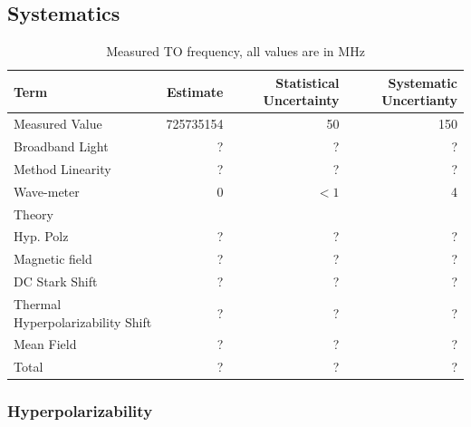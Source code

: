 \documentclass[aps,prl,
,reprint,
superscriptaddress,
onecolumn,
showpacs,preprintnumbers,
 amsmath,amssymb,
]{revtex4-1}
\begin{document}
\subsection{Systematics}



\begin{table}[h]
\centering
\begin{tabular}{l|r|r|r}
\hline
Term              & Estimate & Statistical Uncertainty & Systematic Uncertianty \\
\hline
Measured Value      & 725735154             & 50    & 150            \\
Broadband Light     & ?                     & ?     & ?        \\
Method Linearity    & ?                     & ?     & ?             \\
Wave-meter          & 0                     & $<1$    & 4             \\
\hline
\multicolumn{4}{l}{Theory}\\
\hline
Hyp. Polz           & ?                     & ?     & ?        \\
Magnetic field      & ?                     & ?     & ?             \\
DC Stark Shift      & ?                     & ?     & ?             \\
Thermal Hyperpolarizability Shift & ?     & ?     & ?            \\
Mean Field          & ?                     & ?     & ?             \\
\hline
Total               &  ?                    &  ?    & ?
\end{tabular}
\caption{Measured TO frequency, all values are in MHz}
\label{tab:5/tc}
\end{table}



\subsubsection{Hyperpolarizability}
\end{document}
